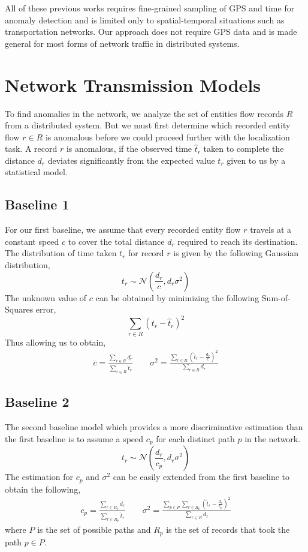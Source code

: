 \documentclass[conference]{IEEEtran.1.8}
\begin{document}
All of these previous works \cite{Chawla2012, Ge2011, Liu2011, Pan2013, Zhang2011, Zhang2012} requires fine-grained sampling of GPS and time for anomaly detection and is limited only to spatial-temporal situations such as transportation networks. Our approach does not require GPS data and is made general for most forms of network traffic in distributed systems.

\section{Network Transmission Models}
\label{sec:models}

To find anomalies in the network, we analyze the set of entities flow records $R$ from a distributed system. But we must first determine which recorded entity flow $r \in R$ is anomalous before we could proceed further with the localization task. A record $r$ is anomalous, if the observed time $\hat{t}_r$ taken to complete the distance $d_r$ deviates significantly from the expected value $t_r$ given to us by a statistical model.

\subsection{Baseline 1}

For our first baseline, we assume that every recorded entity flow $r$ travels at a constant speed $c$ to cover the total distance $d_r$ required to reach its destination. The distribution of time taken $t_r$ for record $r$ is given by the following Gaussian distribution,
\[ t_r \sim \mathcal{N} \left( \frac{d_r}{c}, d_r \sigma^2 \right) \]
The unknown value of $c$ can be obtained by minimizing the following Sum-of-Squares error,
\[ \sum_{r \in R} (t_r - \hat{t}_r)^2 \]
Thus allowing us to obtain,
\begin{gather*}
	c = \frac{\sum_{r \in R} d_r}{\sum_{r \in R} \hat{t}_r} \qquad
    \sigma^2 = \frac{ \sum_{r \in R} \left( \hat{t}_r - \frac{d_r}{c} \right)^2 }{ \sum_{r \in R} d_r }
\end{gather*}

\subsection{Baseline 2}

The second baseline model which provides a more discriminative estimation than the first baseline is to assume a speed $c_p$ for each distinct path $p$ in the network.
\[ t_r \sim \mathcal{N} \left( \frac{d_r}{c_p}, d_r \sigma^2 \right) \]
The estimation for $c_p$ and $\sigma^2$ can be easily extended from the first baseline to obtain the following,
\begin{gather*}
	c_p = \frac{\sum_{r \in R_p} d_r}{\sum_{r \in R_p} \hat{t}_r} \qquad
    \sigma^2 = \frac{ \sum_{p \in P} \sum_{r \in R_p} \left( \hat{t}_r - \frac{d_r}{c_p} \right)^2 }{ \sum_{r \in R} d_r }
\end{gather*}
where $P$ is the set of possible paths and $R_p$ is the set of records that took the path $p \in P$.
\end{document}
